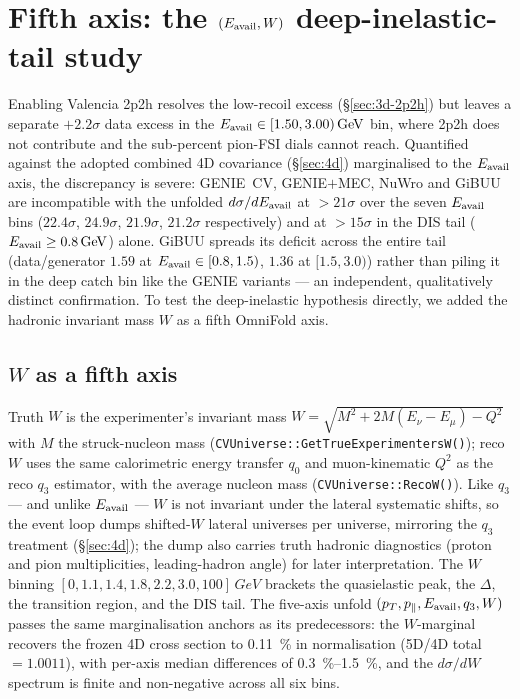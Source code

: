 \section{Fifth axis: the $(\Eavail,W)$ deep-inelastic-tail study}
\label{sec:eavailw}

Enabling Valencia 2p2h resolves the low-recoil excess (\S\ref{sec:3d-2p2h})
but leaves a separate $+2.2\sigma$ data excess in the
$\Eavail\in[1.50,3.00)\,\si{GeV}$ bin, where 2p2h does not contribute and the
sub-percent pion-FSI dials cannot reach. Quantified against the adopted
combined 4D covariance (\S\ref{sec:4d}) marginalised to the $\Eavail$ axis,
the discrepancy is severe: GENIE~CV, GENIE$+$MEC, NuWro and GiBUU are
incompatible with the unfolded $d\sigma/d\Eavail$ at $>21\sigma$ over the
seven $\Eavail$ bins ($22.4\sigma$, $24.9\sigma$, $21.9\sigma$, $21.2\sigma$
respectively) and at $>15\sigma$ in the DIS tail
($\Eavail\ge\SI{0.8}{GeV}$) alone. GiBUU spreads its deficit across the entire
tail (data/generator $1.59$ at $\Eavail\in[0.8,1.5)$, $1.36$ at $[1.5,3.0)$)
rather than piling it in the deep catch bin like the GENIE variants --- an
independent, qualitatively distinct confirmation. To test the deep-inelastic
hypothesis directly, we added the hadronic invariant mass $W$ as a fifth
OmniFold axis.

\subsection{$W$ as a fifth axis}
\label{sec:eavailw-axis}
Truth $W$ is the experimenter's invariant mass
$W=\sqrt{M^{2}+2M(E_\nu-E_\mu)-Q^{2}}$ with $M$ the struck-nucleon mass
(\texttt{CVUniverse::GetTrueExperimentersW()}); reco $W$ uses the same
calorimetric energy transfer $q_{0}$ and muon-kinematic $Q^{2}$ as the reco
$q_{3}$ estimator, with the average nucleon mass
(\texttt{CVUniverse::RecoW()}). Like $q_{3}$ --- and unlike $\Eavail$ --- $W$
is not invariant under the lateral systematic shifts, so the event loop dumps
shifted-$W$ lateral universes per universe, mirroring the $q_{3}$ treatment
(\S\ref{sec:4d}); the dump also carries truth hadronic diagnostics (proton and
pion multiplicities, leading-hadron angle) for later interpretation. The $W$
binning $[0,1.1,1.4,1.8,2.2,3.0,100]\,\si{GeV}$ brackets the quasielastic
peak, the $\Delta$, the transition region, and the DIS tail. The five-axis
unfold $(\pT,\pPar,\Eavail,q_{3},W)$ passes the same marginalisation anchors
as its predecessors: the $W$-marginal recovers the frozen 4D cross section to
\SI{0.11}{\percent} in normalisation (5D/4D total $=1.0011$), with per-axis
median differences of \SIrange{0.3}{1.5}{\percent}, and the
$d\sigma/dW$ spectrum is finite and non-negative across all six bins.


